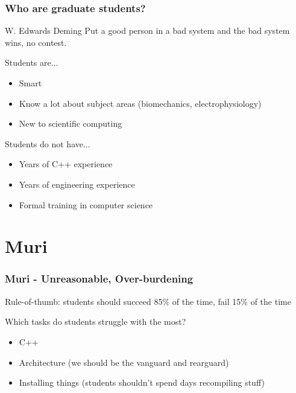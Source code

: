 \documentclass[8pt]{beamer}
\begin{document}
\begin{frame}
    \frametitle{Who are graduate students?}
    \begin{aquote}{W. Edwards Deming}
      Put a good person in a bad system and the bad system wins, no contest.
    \end{aquote}

    Students are...
    \begin{itemize}
      \item Smart
      \item Know a lot about subject areas (biomechanics, electrophysiology)
      \item New to scientific computing
    \end{itemize}

    \vfill
    Students do not have...
    \begin{itemize}
      \item Years of C++ experience
      \item Years of engineering experience
      \item Formal training in computer science
    \end{itemize}
\end{frame}

\section{Muri}
\begin{frame}
  \frametitle{Muri - Unreasonable, Over-burdening}
  Rule-of-thumb: students should succeed 85\% of the time, fail 15\% of the time

  Which tasks do students struggle with the most?
  \begin{itemize}
    \item C++
    \item Architecture (we should be the vanguard and rearguard)
    \item Installing things (students shouldn't spend days recompiling stuff)
  \end{itemize}
\end{frame}
\end{document}
